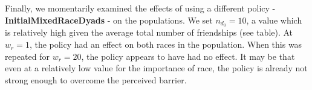 
Finally, we momentarily examined the effects of using a different policy - {\bf InitialMixedRaceDyads} - on the 
populations. We set $n_{d_0}=10$, a value which is relatively high given the average total number of friendships (see table). At $w_r=1$, the policy had an effect on both races in the population. When this was repeated for $w_r=20$, the policy appears to have had no effect. It may be that even at a relatively low value for the importance of race, the policy is already not strong enough to overcome the perceived barrier.
